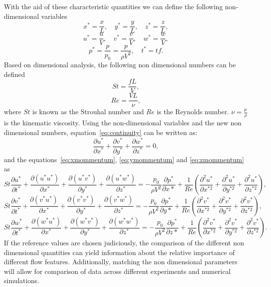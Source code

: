 With the aid of these characteristic quantities we can define the following non-dimensional variables
\begin{equation*}
	x^*=\frac{x}{L}, \quad y^*=\frac{y}{L}, \quad z^*=\frac{z}{L},
\end{equation*}
\begin{equation*}
	u^*=\frac{u}{V}, \quad v^*=\frac{v}{V}, \quad w^*=\frac{w}{V},
\end{equation*}
\begin{equation*}
	p^*=\frac{p}{p_0}=\frac{p}{\rho V^2}, \quad t^*= tf.
\end{equation*}
Based on dimensional analysis, the following non dimensional numbers can be defined
\begin{equation}
St = \frac{fL}{V}, \label{eq:Stdefn} 
\end{equation}
\begin{equation}
Re = \frac{V L}{\nu} , \label{eq:Redefn}
\end{equation}
where $St$ is known as the Strouhal number and $Re$ is the Reynolds number. $\nu=\frac{\mu}{\rho}$ is the kinematic viscosity. Using the non-dimensional variables and the new non dimensional numbers, equation~\ref{eq:continuity} can be written as:
\begin{equation*}
\frac{\partial u^*}{\partial x^*} + \frac{\partial v^*}{\partial y^*} + \frac{\partial w^*}{\partial z^*}= 0,
\end{equation*}
and the equations~\ref{eq:xmommentum}, \ref{eq:ymommentum} and \ref{eq:zmommentum} as 
\begin{equation*}
St \frac{\partial u^*}{\partial t^*} + \frac{\partial (u^* u^*)}{\partial x^*} +  \frac{\partial (u^* v^*)}{\partial y^*} + \frac{\partial (u^* w^*)}{\partial z^*} = -\frac{p_0}{\rho V^2}\frac{\partial p^*}{\partial x*} + \frac{1}{Re}\left( \frac{\partial^2 u^*}{\partial x^{*2}} + \frac{\partial^2 u^*}{\partial y^{*2}} + \frac{\partial^2 u^*}{\partial z^{*2}}\right),
\end{equation*}
\begin{equation*}
St\frac{\partial v^*}{\partial t^*} + \frac{\partial (v^*u^*)}{\partial x^*} + \frac{\partial (v^*v^*)}{\partial y^*} +\frac{\partial (v^*w^*)}{\partial z^*} = -\frac{p_0}{\rho V^2}\frac{\partial p^*}{\partial y*} + \frac{1}{Re}\left( \frac{\partial^2 v^*}{\partial x^{*2}} + \frac{\partial^2 v^*}{\partial y^{*2}} + \frac{\partial^2 v^*}{\partial z^{*2}}\right),
\end{equation*}
\begin{equation*}
St\frac{\partial w^*}{\partial t^*} + \frac{\partial (w^*u^*)}{\partial x^*} + \frac{\partial (w^*v^*)}{\partial y^*} +\frac{\partial (w^*w^*)}{\partial z^*} = -\frac{p_0}{\rho V^2}\frac{\partial p^*}{\partial z*} + \frac{1}{Re}\left( \frac{\partial^2 v^*}{\partial x^{*2}} + \frac{\partial^2 v^*}{\partial y^{*2}} + \frac{\partial^2 v^*}{\partial z^{*2}}\right).
\end{equation*}
If the reference values are chosen judiciously, the comparison of the different non dimensional quantities can yield information about the relative importance of different flow features. Additionally, matching the non dimensional parameters will allow for comparison of data across different experiments and numerical simulations. 

